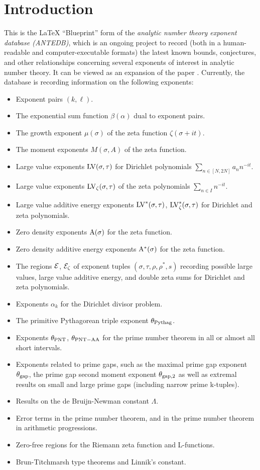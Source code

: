 \chapter{Introduction}\label{intro-chapter}

This is the LaTeX ``Blueprint'' form of the \emph{analytic number theory exponent database (ANTEDB)}, which is an ongoing project to record (both in a human-readable and computer-executable formats) the latest known bounds, conjectures, and other relationships concerning several exponents of interest in analytic number theory.  It can be viewed as an expansion of the paper \cite{trudgian-yang}. Currently, the database is recording information on the following exponents:

\begin{itemize}
\item Exponent pairs $(k,\ell)$.
\item The exponential sum function $\beta(\alpha)$ dual to exponent pairs.
\item The growth exponent $\mu(\sigma)$ of the zeta function $\zeta(\sigma+it)$.
\item The moment exponents $M(\sigma,A)$ of the zeta function.
\item Large value exponents $\mathrm{LV}(\sigma, \tau)$ for Dirichlet polynomials $\sum_{n \in [N,2N]} a_n n^{-it}$.
\item Large value exponents $\mathrm{LV}_\zeta(\sigma, \tau)$ of the zeta polynomials $\sum_{n \in I} n^{-it}$.
\item Large value additive energy exponents $\mathrm{LV}^*(\sigma, \tau)$, $\mathrm{LV}^*_\zeta(\sigma, \tau)$ for Dirichlet and zeta polynomials.
\item Zero density exponents $\mathrm{A}(\sigma)$ for the zeta function.
\item Zero density additive energy exponents $\mathrm{A}^*(\sigma)$ for the zeta function.
\item The regions $\mathcal{E}$, $\mathcal{E}_\zeta$ of exponent tuples $(\sigma,\tau,\rho,\rho^*,s)$ recording possible large values, large value additive energy, and double zeta sums for Dirichlet and zeta polynomials.
\item Exponents $\alpha_k$ for the Dirichlet divisor problem.
\item The primitive Pythagorean triple exponent $\theta_{\mathrm{Pythag}}$.
\item Exponents $\theta_{\mathrm{PNT}}$, $\theta_{\mathrm{PNT-AA}}$ for the prime number theorem in all or almost all short intervals.
\item Exponents related to prime gaps, such as the maximal prime gap exponent $\theta_{\mathrm{gap}}$, the prime gap second moment exponent $\theta_{\mathrm{gap},2}$ as well as extremal results on small and large prime gaps (including narrow prime k-tuples).
\item Results on the de Bruijn-Newman constant $\Lambda$.
\item Error terms in the prime number theorem, and in the prime number theorem in arithmetic progressions.
\item Zero-free regions for the Riemann zeta function and L-functions.
\item Brun-Titchmarsh type theorems and Linnik's constant.
\end{itemize}

